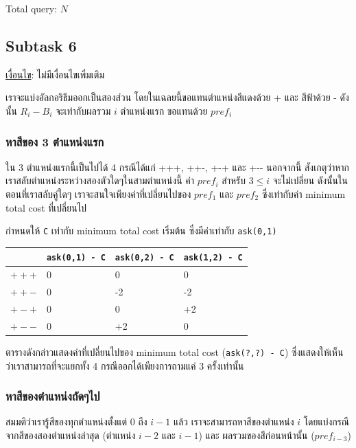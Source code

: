 \documentclass[12pt]{article}
\newcommand{\code}[1]{\texttt{\scriptsize{#1}}}
\begin{document}
Total query: $N$

\subsection{Subtask 6}

\underline{เงื่อนไข}: ไม่มีเงื่อนไขเพิ่มเติม

เราจะแบ่งอัลกอริธึมออกเป็นสองส่วน โดยในเฉลยนี้ขอแทนตำแหน่งสีแดงด้วย + และ สีฟ้าด้วย - ดังนั้น $R_i - B_i$ จะเท่ากับผลรวม $i$ ตำแหน่งแรก ขอแทนด้วย $pref_i$

\subsubsection{หาสีของ 3 ตำแหน่งแรก}

ใน 3 ตำแหน่งแรกนี้เป็นไปได้ 4 กรณีได้แก่ +++, ++-, +-+ และ +{-}{-} นอกจากนี้ สังเกตุว่าหากเราสลับตำแหน่งระหว่างสองตัวใดๆในสามตำแหน่งนี้ ค่า $pref_i$ สำหรับ $3 \leq i$ จะไม่เปลี่ยน ดังนั้นในตอนที่เราสลับคู่ใดๆ เราจะสนใจเพียงค่าที่เปลี่ยนไปของ $pref_1$ และ $pref_2$ ซึ่งเท่ากับค่า minimum total cost ที่เปลี่ยนไป

กำหนดให้ \code{C} เท่ากับ minimum total cost เริ่มต้น ซึ่งมีค่าเท่ากับ \code{ask(0,1)}

\newpage

\begin{table}[h]
\centering
\begin{tabular}{ | m{2cm} | P{2cm} | P{2cm} | P{2cm} |} 
\hline
& \code{ask(0,1) - C} & \code{ask(0,2) - C} & \code{ask(1,2) - C} \\ 
\hline
$+++$& 0 & 0 & 0 \\ 
\hline
$++-$& 0 & -2 & -2 \\ 
\hline
$+-+$& 0 & 0 & +2 \\ 
\hline
$+--$& 0 & +2 & 0 \\ 
\hline
\end{tabular}
\end{table}

ตารางดังกล่าวแสดงค่าที่เปลี่ยนไปของ minimum total cost (\code{ask(?,?) - C}) ซึ่งแสดงให้เห็นว่าเราสามารถที่จะแยกทั้ง 4 กรณีออกได้เพียงการถามแค่ 3 ครั้งเท่านั้น

\subsubsection{หาสีของตำแหน่งถัดๆไป}

สมมติว่าเรารู้สีของทุกตำแหน่งตั้งแต่ 0 ถึง $i-1$ แล้ว เราจะสามารถหาสีของตำแหน่ง $i$ โดยแบ่งกรณีจากสีของสองตำแหน่งล่าสุด (ตำแหน่ง $i-2$ และ $i-1$) และ ผลรวมของสีก่อนหน้านั้น ($pref_{i-3}$)
\end{document}
